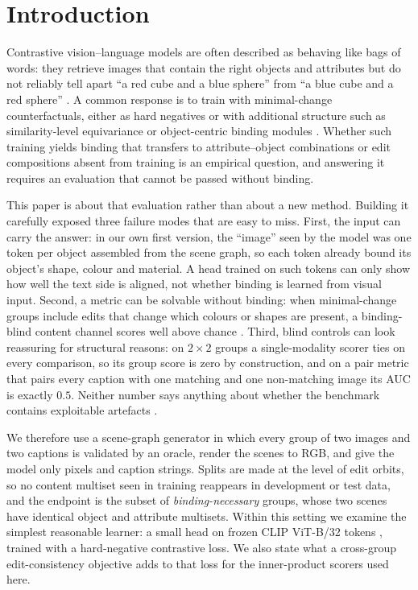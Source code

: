\section{Introduction}
\label{sec:intro}

Contrastive vision--language models are often described as behaving like bags of words: they
retrieve images that contain the right objects and attributes but do not reliably tell apart
``a red cube and a blue sphere'' from ``a blue cube and a red sphere''
\citep{yuksekgonul2023bow,thrush2022winoground,lewis2024clipbind}. A common response is to train with
minimal-change counterfactuals, either as hard negatives \citep{yuksekgonul2023bow,zhang2024contrasting,
zhang2024countercurate,awal2024vismin} or with additional structure such as similarity-level
equivariance \citep{wang2023eqsim} or object-centric binding modules \citep{assouel2025occlip}.
Whether such training yields binding that transfers to attribute--object combinations or edit
compositions absent from training is an empirical question, and answering it requires an
evaluation that cannot be passed without binding.

This paper is about that evaluation rather than about a new method. Building it carefully exposed
three failure modes that are easy to miss. First, the input can carry the answer: in our own first
version, the ``image'' seen by the model was one token per object assembled from the scene graph,
so each token already bound its object's shape, colour and material. A head trained on such
tokens can only show how well the text side is aligned, not whether binding is learned from
visual input. Second, a metric can be solvable without binding: when minimal-change groups include
edits that change which colours or shapes are present, a binding-blind content channel scores well
above chance \citep[cf.][]{hsieh2023sugarcrepe}. Third, blind controls can look reassuring for
structural reasons: on $2{\times}2$ groups a single-modality scorer ties on every comparison, so
its group score is zero by construction, and on a pair metric that pairs every caption with one
matching and one non-matching image its AUC is exactly $0.5$. Neither number says anything about
whether the benchmark contains exploitable artefacts \citep[cf.][]{lin2024languagepriors}.

We therefore use a scene-graph generator in which every group of two images and two captions is
validated by an oracle, render the scenes to RGB, and give the model only pixels and caption
strings. Splits are made at the level of edit orbits, so no content multiset seen in training
reappears in development or test data, and the endpoint is the subset of \emph{binding-necessary}
groups, whose two scenes have identical object and attribute multisets. Within this setting we
examine the simplest reasonable learner: a small head on frozen CLIP ViT-B/32 tokens
\citep{radford2021clip,ilharco2021openclip}, trained with a hard-negative contrastive loss. We also
state what a cross-group edit-consistency objective adds to that loss for the inner-product scorers
used here.


